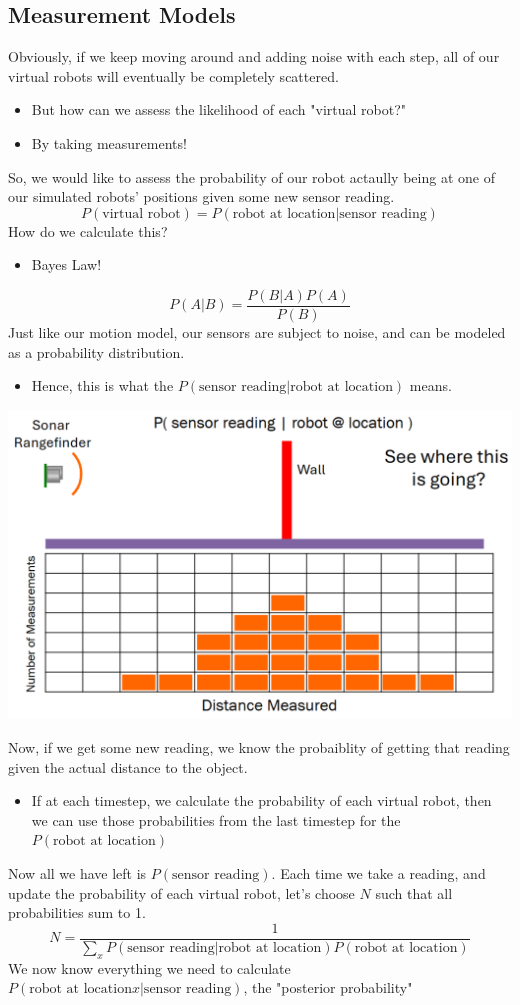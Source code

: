 \documentclass[10pt]{article}
\begin{document}
\subsection*{Measurement Models}
Obviously, if we keep moving around and adding noise with each step, all of our virtual robots will eventually be completely scattered.
\begin{itemize}
	\item But how can we assess the likelihood of each "virtual robot?"
	\item By taking measurements!
\end{itemize}
So, we would like to assess the probability of our robot actaully being at one of our simulated robots' positions given some new sensor reading.
\[P(\text{virtual robot}) = P(\text{robot at location} | \text{sensor reading})\]
How do we calculate this?
\begin{itemize}
	\item Bayes Law!
\end{itemize}
\[P(A|B) = \frac{P(B|A) P(A)}{P(B)}\]
Just like our motion model, our sensors are subject to noise, and can be modeled as a probability distribution.
\begin{itemize}
	\item Hence, this is what the $P(\text{sensor reading} | \text{robot at location})$ means.
\end{itemize}
\begin{center} 
	\includegraphics*[width=\textwidth]{L1_10.png} 
\end{center}
Now, if we get some new reading, we know the probaiblity of getting that reading given the actual distance to the object.
\begin{itemize}
	\item If at each timestep, we calculate the probability of each virtual robot, then we can use those probabilities from the last timestep for the $P(\text{robot at location})$
\end{itemize}
Now all we have left is $P(\text{sensor reading})$.  Each time we take a reading, and update the probability of each virtual robot, let's choose $N$ such that all probabilities sum to 1.
\[N = \frac{1}{\sum_x P(\text{sensor reading} | \text{robot at location}) P(\text{robot at location})}\]
We now know everything we need to calculate $P(\text{robot at location} x | \text{sensor reading})$, the "posterior probability"
\end{document}
